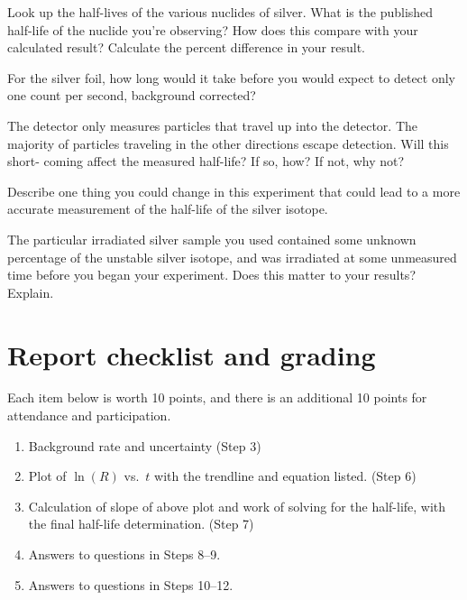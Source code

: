 \begin{steps}
	\item Look up the half-lives of the various nuclides of silver. What is the published
	half-life of the nuclide you’re observing? How does this compare with your
	calculated result? Calculate the percent difference in your result.
	
	\item For the silver foil, how long would it take before you would expect to detect only
	one count per second, background corrected?
	
	\item The detector only measures particles that travel up into the detector. The majority
	of particles traveling in the other directions escape detection. Will this short-
	coming affect the measured half-life? If so, how? If not, why not?
	
	\item Describe one thing you could change in this experiment that could lead to a more
	accurate measurement of the half-life of the silver isotope.
	
	\item The particular irradiated silver sample you used contained some unknown
	percentage of the unstable silver isotope, and was irradiated at some unmeasured
	time before you began your experiment. Does this matter to your results? Explain.
	
\end{steps}

\section{Report checklist and grading}

Each item below is worth 10 points, and there is an additional 10 points for attendance and participation.

\begin{enumerate}
	\item Background rate and uncertainty (Step 3)
	
	\item Plot of $\ln(R)$ vs.\ $t$ with the trendline and equation listed. (Step 6)
	
	\item Calculation of slope of above plot and work of solving for the half-life, with the final half-life determination. (Step 7)
	
	\item Answers to questions in Steps 8--9.
	
	\item Answers to questions in Steps 10--12.
\end{enumerate}